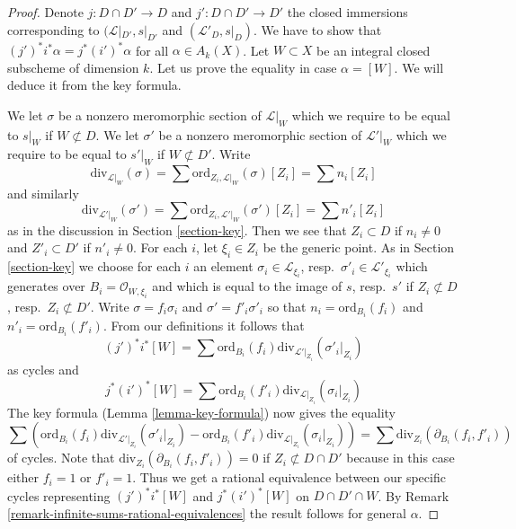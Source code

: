 \begin{proof}
Denote $j : D \cap D' \to D$ and $j' : D \cap D' \to D'$ the closed
immersions corresponding to $(\mathcal{L}|_{D'}, s|_{D'}$ and
$(\mathcal{L}'_D, s|_D)$. We have to show that
$(j')^*i^*\alpha = j^* (i')^*\alpha$ for all $\alpha \in A_k(X)$.
Let $W \subset X$ be an integral closed subscheme of dimension $k$.
Let us prove the equality in case $\alpha = [W]$. We will deduce
it from the key formula.

\medskip\noindent
We let $\sigma$ be a nonzero meromorphic section of $\mathcal{L}|_W$
which we require to be equal to $s|_W$ if $W \not \subset D$.
We let $\sigma'$ be a nonzero meromorphic section of $\mathcal{L}'|_W$
which we require to be equal to $s'|_W$ if $W \not \subset D'$.
Write
$$
\text{div}_{\mathcal{L}|_W}(\sigma) =
\sum \text{ord}_{Z_i, \mathcal{L}|_W}(\sigma)[Z_i] = \sum n_i[Z_i]
$$
and similarly
$$
\text{div}_{\mathcal{L}'|_W}(\sigma') =
\sum \text{ord}_{Z_i, \mathcal{L}'|_W}(\sigma')[Z_i] = \sum n'_i[Z_i]
$$
as in the discussion in Section \ref{section-key}.
Then we see that $Z_i \subset D$ if $n_i \not = 0$ and
$Z'_i \subset D'$ if $n'_i \not = 0$. For each $i$, let $\xi_i \in Z_i$
be the generic point. As in Section \ref{section-key} we choose
for each $i$ an element
$\sigma_i \in \mathcal{L}_{\xi_i}$, resp.\ $\sigma'_i \in \mathcal{L}'_{\xi_i}$
which generates over $B_i = \mathcal{O}_{W, \xi_i}$
and which is equal to the image of
$s$, resp.\ $s'$ if $Z_i \not \subset D$, resp.\ $Z_i \not \subset D'$.
Write $\sigma = f_i \sigma_i$ and $\sigma' = f'_i\sigma'_i$ so that
$n_i = \text{ord}_{B_i}(f_i)$ and
$n'_i = \text{ord}_{B_i}(f'_i)$.
From our definitions it follows that
$$
(j')^*i^*[W] =
\sum \text{ord}_{B_i}(f_i) \text{div}_{\mathcal{L}'|_{Z_i}}(\sigma'_i|_{Z_i})
$$
as cycles and
$$
j^*(i')^*[W] =
\sum \text{ord}_{B_i}(f'_i) \text{div}_{\mathcal{L}|_{Z_i}}(\sigma_i|_{Z_i})
$$
The key formula (Lemma \ref{lemma-key-formula}) now gives the equality
$$
\sum \left(
\text{ord}_{B_i}(f_i) \text{div}_{\mathcal{L}'|_{Z_i}}(\sigma'_i|_{Z_i}) -
\text{ord}_{B_i}(f'_i) \text{div}_{\mathcal{L}|_{Z_i}}(\sigma_i|_{Z_i})
\right) =
\sum \text{div}_{Z_i}(\partial_{B_i}(f_i, f'_i))
$$
of cycles. Note that $\text{div}_{Z_i}(\partial_{B_i}(f_i, f'_i)) = 0$ if
$Z_i \not \subset D \cap D'$ because in this case either $f_i = 1$
or $f'_i = 1$. Thus we get a rational equivalence between our specific
cycles representing $(j')^*i^*[W]$ and $j^*(i')^*[W]$ on $D \cap D' \cap W$.
By Remark \ref{remark-infinite-sums-rational-equivalences}
the result follows for general $\alpha$.
\end{proof}
















